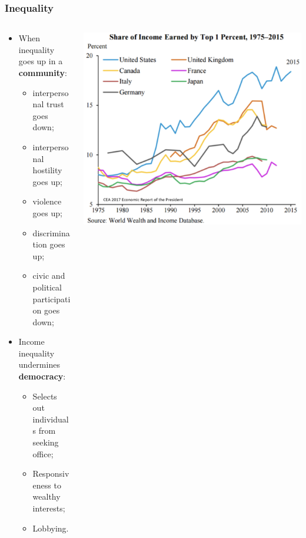\documentclass[aspectratio=169]{beamer}
\theoremstyle{principle}
\begin{document}
\begin{frame}
\frametitle{Inequality}

\begin{columns}
\begin{column}{0.5\textwidth}

\begin{itemize}
\item When inequality goes up in a \textbf{community}:
\begin{itemize}
\item interpersonal trust goes down;
\item interpersonal hostility goes up;
\item violence goes up;
\item discrimination goes up;
\item civic and political participation goes down;
\end{itemize}
\bigskip
\bigskip
\item Income inequality undermines \textbf{democracy}:
\begin{itemize}
\item Selects out individuals from seeking office;
\item Responsiveness to wealthy interests;
\item Lobbying.
\end{itemize}
\end{itemize}
\end{column}

\begin{column}{0.5\textwidth}
\begin{center}
\includegraphics[scale=0.3]{inequality_2.png}
\end{center}
\end{column}
\end{columns}

\end{frame}
\end{document}

